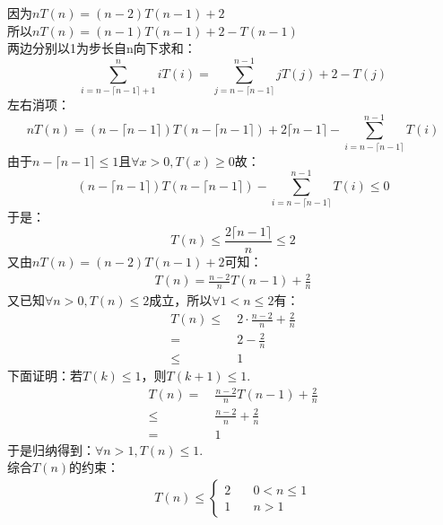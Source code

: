 \begin{solution}
    因为$nT(n)=(n-2)T(n-1)+2$\\
    所以$nT(n)=(n-1)T(n-1)+2-T(n-1)$\\
    两边分别以1为步长自n向下求和：
    \begin{displaymath}
        \sum_{i = n - \lceil n - 1 \rceil +1}^{n} iT(i) = 
        \sum_{j = n - \lceil n - 1 \rceil}^{n - 1} jT(j) + 2 - T(j) 
    \end{displaymath}
    左右消项：
    \begin{displaymath}
        nT(n) = (n - \lceil n - 1 \rceil)T(n - \lceil n - 1 \rceil) + 2 \lceil n - 1 \rceil - \sum_{i = n - \lceil n - 1 \rceil}^{n - 1} T(i)
    \end{displaymath}
    由于$n - \lceil n - 1 \rceil \le 1$且$\forall x>0, T(x) \ge 0$故：
    \begin{displaymath}
        (n - \lceil n - 1 \rceil)T(n - \lceil n - 1 \rceil) - \sum_{i = n - \lceil n - 1 \rceil}^{n - 1} T(i) \le 0
    \end{displaymath}   
    于是：
    $$T(n)\le \frac{2\lceil n - 1 \rceil}{n} \le 2$$
    又由$nT(n)=(n-2)T(n-1)+2$可知：
    \begin{align*}
        T(n)=\frac{n-2}{n}T(n-1)+\frac{2}{n}
    \end{align*}
    又已知$\forall n>0,T(n) \le 2$成立，所以$\forall 1 < n \le 2$有：
    \begin{align*}
        T(n) \le& ~2 \cdot\frac{n-2}{n}+ \frac{2}{n}\\
             =& ~2 - \frac{2}{n}\\
             \le& ~1
    \end{align*}
    下面证明：若$T(k)\le 1$，则$T(k+1) \le 1$.\\
    \begin{align*}
        T(n) =& ~\frac{n-2}{n}T(n-1)+\frac{2}{n}\\
        \le& ~\frac{n-2}{n}+\frac{2}{n}\\
        =& ~1
    \end{align*}
    于是归纳得到：$\forall n>1,T(n)\le 1$.\\
    综合$T(n)$的约束：
    \begin{align*}
       T(n) \le \left\{
        \begin{aligned}
            2& \quad 0 < n \le 1 \\
            1& \quad n > 1
        \end{aligned}
       \right.
    \end{align*}

\end{solution}
